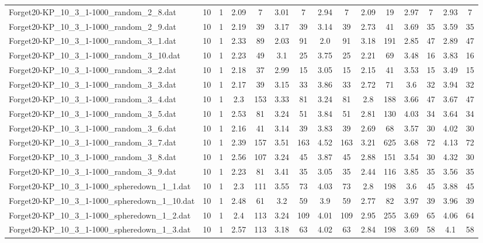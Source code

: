 \begin{table}[!ht]
{\begin{tabular}{lcccccccccccccc}
Forget20-KP\_10\_3\_1-1000\_random\_2\_8.dat & 10 & 1 & 2.09 & 7 & 3.01 & 7 & 2.94 & 7 & 2.09 & 19 & 2.97 & 7 & 2.93 & 7 \\
Forget20-KP\_10\_3\_1-1000\_random\_2\_9.dat & 10 & 1 & 2.19 & 39 & 3.17 & 39 & 3.14 & 39 & 2.73 & 41 & 3.69 & 35 & 3.59 & 35 \\
Forget20-KP\_10\_3\_1-1000\_random\_3\_1.dat & 10 & 1 & 2.33 & 89 & 2.03 & 91 & 2.0 & 91 & 3.18 & 191 & 2.85 & 47 & 2.89 & 47 \\
Forget20-KP\_10\_3\_1-1000\_random\_3\_10.dat & 10 & 1 & 2.23 & 49 & 3.1 & 25 & 3.75 & 25 & 2.21 & 69 & 3.48 & 16 & 3.83 & 16 \\
Forget20-KP\_10\_3\_1-1000\_random\_3\_2.dat & 10 & 1 & 2.18 & 37 & 2.99 & 15 & 3.05 & 15 & 2.15 & 41 & 3.53 & 15 & 3.49 & 15 \\
Forget20-KP\_10\_3\_1-1000\_random\_3\_3.dat & 10 & 1 & 2.17 & 39 & 3.15 & 33 & 3.86 & 33 & 2.72 & 71 & 3.6 & 32 & 3.94 & 32 \\
Forget20-KP\_10\_3\_1-1000\_random\_3\_4.dat & 10 & 1 & 2.3 & 153 & 3.33 & 81 & 3.24 & 81 & 2.8 & 188 & 3.66 & 47 & 3.67 & 47 \\
Forget20-KP\_10\_3\_1-1000\_random\_3\_5.dat & 10 & 1 & 2.53 & 81 & 3.24 & 51 & 3.84 & 51 & 2.81 & 130 & 4.03 & 34 & 3.64 & 34 \\
Forget20-KP\_10\_3\_1-1000\_random\_3\_6.dat & 10 & 1 & 2.16 & 41 & 3.14 & 39 & 3.83 & 39 & 2.69 & 68 & 3.57 & 30 & 4.02 & 30 \\
Forget20-KP\_10\_3\_1-1000\_random\_3\_7.dat & 10 & 1 & 2.39 & 157 & 3.51 & 163 & 4.52 & 163 & 3.21 & 625 & 3.68 & 72 & 4.13 & 72 \\
Forget20-KP\_10\_3\_1-1000\_random\_3\_8.dat & 10 & 1 & 2.56 & 107 & 3.24 & 45 & 3.87 & 45 & 2.88 & 151 & 3.54 & 30 & 4.32 & 30 \\
Forget20-KP\_10\_3\_1-1000\_random\_3\_9.dat & 10 & 1 & 2.23 & 81 & 3.41 & 35 & 3.05 & 35 & 2.44 & 116 & 3.85 & 35 & 3.56 & 35 \\
Forget20-KP\_10\_3\_1-1000\_spheredown\_1\_1.dat & 10 & 1 & 2.3 & 111 & 3.55 & 73 & 4.03 & 73 & 2.8 & 198 & 3.6 & 45 & 3.88 & 45 \\
Forget20-KP\_10\_3\_1-1000\_spheredown\_1\_10.dat & 10 & 1 & 2.48 & 61 & 3.2 & 59 & 3.9 & 59 & 2.77 & 82 & 3.97 & 39 & 3.96 & 39 \\
Forget20-KP\_10\_3\_1-1000\_spheredown\_1\_2.dat & 10 & 1 & 2.4 & 113 & 3.24 & 109 & 4.01 & 109 & 2.95 & 255 & 3.69 & 65 & 4.06 & 64 \\
Forget20-KP\_10\_3\_1-1000\_spheredown\_1\_3.dat & 10 & 1 & 2.57 & 113 & 3.18 & 63 & 4.02 & 63 & 2.84 & 198 & 3.69 & 58 & 4.1 & 58 \\

\end{tabular}}
\end{table}
